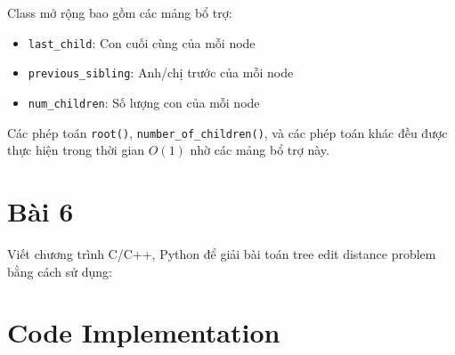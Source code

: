 \documentclass[12pt]{article}
\begin{document}
Class mở rộng bao gồm các mảng bổ trợ:
\begin{itemize}
    \item \texttt{last\_child}: Con cuối cùng của mỗi node
    \item \texttt{previous\_sibling}: Anh/chị trước của mỗi node  
    \item \texttt{num\_children}: Số lượng con của mỗi node
\end{itemize}

Các phép toán \texttt{root()}, \texttt{number\_of\_children()}, và các phép toán khác đều được thực hiện trong thời gian $O(1)$ nhờ các mảng bổ trợ này.

\section{Bài 6}
Viết chương trình C/C++, Python để giải bài toán tree edit distance problem bằng cách sử dụng:

\section{Code Implementation}
\end{document}
